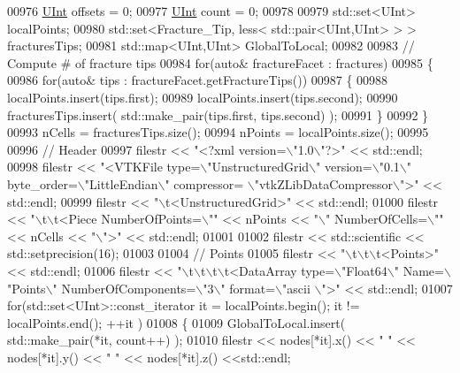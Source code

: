 \begin{DoxyCode}
00976     \hyperlink{namespaceFVCode3D_a4bf7e328c75d0fd504050d040ebe9eda}{UInt} offsets = 0;
00977     \hyperlink{namespaceFVCode3D_a4bf7e328c75d0fd504050d040ebe9eda}{UInt} count = 0;
00978 
00979     std::set<UInt> localPoints;
00980     std::set<Fracture\_Tip, less< std::pair<UInt,UInt> > > fracturesTips;
00981     std::map<UInt,UInt> GlobalToLocal;
00982 
00983     \textcolor{comment}{// Compute # of fracture tips}
00984     \textcolor{keywordflow}{for}(\textcolor{keyword}{auto}& fractureFacet : fractures)
00985     \{
00986         \textcolor{keywordflow}{for}(\textcolor{keyword}{auto}& tips : fractureFacet.getFractureTips())
00987         \{
00988             localPoints.insert(tips.first);
00989             localPoints.insert(tips.second);
00990             fracturesTips.insert( std::make\_pair(tips.first, tips.second) );
00991         \}
00992     \}
00993     nCells = fracturesTips.size();
00994     nPoints = localPoints.size();
00995 
00996     \textcolor{comment}{// Header}
00997     filestr << \textcolor{stringliteral}{"<?xml version=\(\backslash\)"1.0\(\backslash\)"?>"} << std::endl;
00998     filestr << \textcolor{stringliteral}{"<VTKFile type=\(\backslash\)"UnstructuredGrid\(\backslash\)" version=\(\backslash\)"0.1\(\backslash\)" byte\_order=\(\backslash\)"LittleEndian\(\backslash\)" compressor=
      \(\backslash\)"vtkZLibDataCompressor\(\backslash\)">"} << std::endl;
00999     filestr << \textcolor{stringliteral}{"\(\backslash\)t<UnstructuredGrid>"} << std::endl;
01000     filestr << \textcolor{stringliteral}{"\(\backslash\)t\(\backslash\)t<Piece NumberOfPoints=\(\backslash\)""} << nPoints << \textcolor{stringliteral}{"\(\backslash\)" NumberOfCells=\(\backslash\)""} << nCells << \textcolor{stringliteral}{"\(\backslash\)">"} << 
      std::endl;
01001 
01002     filestr << std::scientific << std::setprecision(16);
01003 
01004     \textcolor{comment}{// Points}
01005     filestr << \textcolor{stringliteral}{"\(\backslash\)t\(\backslash\)t\(\backslash\)t<Points>"} << std::endl;
01006     filestr << \textcolor{stringliteral}{"\(\backslash\)t\(\backslash\)t\(\backslash\)t\(\backslash\)t<DataArray type=\(\backslash\)"Float64\(\backslash\)" Name=\(\backslash\)"Points\(\backslash\)" NumberOfComponents=\(\backslash\)"3\(\backslash\)" format=\(\backslash\)"ascii
      \(\backslash\)">"} << std::endl;
01007     \textcolor{keywordflow}{for}(std::set<UInt>::const\_iterator it = localPoints.begin(); it != localPoints.end(); ++it )
01008     \{
01009         GlobalToLocal.insert( std::make\_pair(*it, count++) );
01010         filestr << nodes[*it].x() << \textcolor{stringliteral}{" "} << nodes[*it].y() << \textcolor{stringliteral}{" "} << nodes[*it].z() <<std::endl;

\end{DoxyCode}
